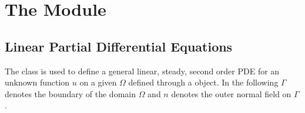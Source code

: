 
%
%
%

\chapter{The \linearPDEs Module}

\section{Linear Partial Differential Equations}
\label{SEC LinearPDE}

The \LinearPDE class is used to define a general linear, steady, second order
PDE for an unknown function $u$ on a given $\Omega$ defined through a \Domain object.
In the following $\Gamma$ denotes the boundary of the domain $\Omega$ and $n$
denotes the outer normal field on $\Gamma$.

